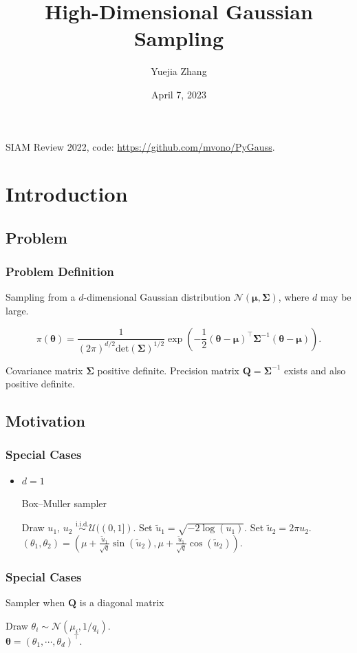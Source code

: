 \documentclass[aspectratio=169]{beamer}
\title{High-Dimensional Gaussian Sampling}
\author{Yuejia Zhang}
\date{April 7, 2023}
\newcommand{\B}[1]{\mathbf{#1}} %
\newcommand{\Bs}[1]{\boldsymbol{#1}} %
\newcommand{\pr}[1]{\left(#1\right)} %
\begin{document}
	
\begin{frame}
    \maketitle
    SIAM Review 2022, code: \url{https://github.com/mvono/PyGauss}.
\end{frame}

\section{Introduction} 
\subsection{Problem}
\begin{frame}
\frametitle{Problem Definition}
Sampling from a \(d\)-dimensional Gaussian distribution \(\mathcal{N}\pr{\Bs{\mu},\B{\Sigma}}\), where \(d\) may be large.

\[
    \pi(\Bs{\theta}) = \dfrac{1}{(2\pi)^{d/2}\text{det}(\B{\Sigma})^{1/2}}\exp\pr{-\dfrac{1}{2}(\Bs{\theta}-\Bs{\mu})^{\top}\B{\Sigma}^{-1}(\Bs{\theta}-\Bs{\mu})}.
\]

Covariance matrix \(\B{\Sigma}\) positive definite. Precision matrix \(\B{Q}=\B{\Sigma}^{-1}\) exists and also positive definite.
\end{frame}

\subsection{Motivation}
\begin{frame}
\frametitle{Special Cases}
\begin{itemize}
\item \(d = 1\)
\begin{algorithm}[H]
\caption{Box--Muller sampler}
\begin{algorithmic}[1]
\State Draw $u_1$, $u_2$ $\overset{\text{i.i.d.}}{\sim} \mathcal{U}((0,1])$.
\State Set $\tilde{u}_1 = \sqrt{-2\log(u_1)}$.
\State Set $\tilde{u}_2 = 2\pi u_2$.\\ 
\Return $(\theta_1,\theta_2) = \pr{\mu + \frac{\tilde{u}_1}{\sqrt{q}} \sin(\tilde{u}_2),\mu + \frac{\tilde{u}_1}{\sqrt{q}} \cos(\tilde{u}_2)}$.
\end{algorithmic}
\end{algorithm}
\end{itemize}
\end{frame}

\begin{frame}
\frametitle{Special Cases}
\begin{algorithm}[H]
\caption{Sampler when $\B{Q}$ is a diagonal matrix}
\label{algo:multi_diag}
\begin{algorithmic}[1]
 \Comment{\textcolor{blue}{In some programming languages, this loop can be vectorized.}} 
\State Draw $\displaystyle{\theta_i \sim \mathcal{N}\pr{\mu_i,1/q_i}}$.
\EndFor\\
\Return $\Bs{\theta} = (\theta_1,\cdots,\theta_d)^{\top}$.
\end{algorithmic}
\end{algorithm}
\end{frame}
\end{document}
